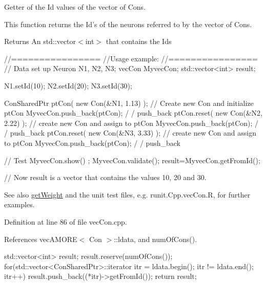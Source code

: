 Getter of the Id values of the vector of Cons. 

This function returns the Id's of the neurons referred to by the vector of Cons. \begin{DoxyReturn}{Returns}
An std::vector$<$int$>$ that contains the Ids
\end{DoxyReturn}

\begin{DoxyCode}
  //================
  //Usage example:
  //================
        // Data set up
                        Neuron N1, N2, N3;
                        vecCon MyvecCon;
                        std::vector<int> result;

                        N1.setId(10);
                        N2.setId(20);
                        N3.setId(30);

                        ConSharedPtr ptCon( new Con(&N1, 1.13) );       // Create
       new Con and initialize ptCon
                        MyvecCon.push_back(ptCon);                              /
      / push_back
                        ptCon.reset(  new Con(&N2, 2.22) );             // create
       new Con and assign to ptCon
                        MyvecCon.push_back(ptCon);                              /
      / push_back
                        ptCon.reset(  new Con(&N3, 3.33) );             // create
       new Con and assign to ptCon
                        MyvecCon.push_back(ptCon);                              /
      / push_back

        // Test
                        MyvecCon.show() ;
                        MyvecCon.validate();
                        result=MyvecCon.getFromId();

        // Now result is a vector that contains the values 10, 20 and 30.
\end{DoxyCode}


\begin{DoxySeeAlso}{See also}
\hyperlink{classvec_con_a76f10669494f2247d036ae6a1f296873}{getWeight} and the unit test files, e.g. runit.Cpp.vecCon.R, for further examples. 
\end{DoxySeeAlso}


Definition at line 86 of file vecCon.cpp.



References vecAMORE$<$ Con $>$::ldata, and numOfCons().


\begin{DoxyCode}
                                  {
        std::vector<int> result;
        result.reserve(numOfCons());
        for(std::vector<ConSharedPtr>::iterator itr = ldata.begin();   itr != 
      ldata.end();   itr++)   { result.push_back((*itr)->getFromId()); }
        return result;
}
\end{DoxyCode}


